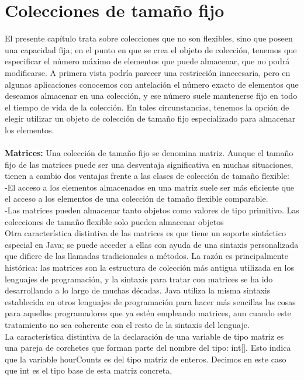 \documentclass[11pt,a4paper]{article}
\begin{document}
\section{Colecciones de tamaño fijo}
El presente capítulo trata sobre colecciones que no son flexibles, sino que poseen una capacidad
fija; en el punto en que se crea el objeto de colección, tenemos que especificar el número máximo
de elementos que puede almacenar, que no podrá modificarse. A primera vista podría parecer una
restricción innecesaria, pero en algunas aplicaciones conocemos con antelación el número exacto
de elementos que deseamos almacenar en una colección, y ese número suele mantenerse fijo en
todo el tiempo de vida de la colección. En tales circunstancias, tenemos la opción de elegir utilizar
un objeto de colección de tamaño fijo especializado para almacenar los elementos.\\
\\
\textbf{Matrices:} Una colección de tamaño fijo se denomina matriz. Aunque el tamaño fijo de las matrices puede ser
una desventaja significativa en muchas situaciones, tienen a cambio dos ventajas frente a las clases
de colección de tamaño flexible:\\
-El acceso a los elementos almacenados en una matriz suele ser más eficiente que el acceso a los
elementos de una colección de tamaño flexible comparable.\\
-Las matrices pueden almacenar tanto objetos como valores de tipo primitivo. Las colecciones de
tamaño flexible solo pueden almacenar objetos\\
Otra característica distintiva de las matrices es que tiene un soporte sintáctico especial en Java; se
puede acceder a ellas con ayuda de una sintaxis personalizada que difiere de las llamadas tradicionales
a métodos. La razón es principalmente histórica: las matrices son la estructura de colección
más antigua utilizada en los lenguajes de programación, y la sintaxis para tratar con matrices se ha
ido desarrollando a lo largo de muchas décadas. Java utiliza la misma sintaxis establecida en otros
lenguajes de programación para hacer más sencillas las cosas para aquellos programadores que ya
estén empleando matrices, aun cuando este tratamiento no sea coherente con el resto de la sintaxis
del lenguaje.\\
La característica distintiva de la declaración de una variable de tipo matriz es una pareja de corchetes
que forman parte del nombre del tipo: int[]. Esto indica que la variable hourCounts es
del tipo matriz de enteros. Decimos en este caso que int es el tipo base de esta matriz concreta,
\end{document}
